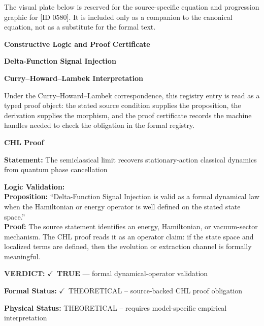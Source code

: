 \begingroup\footnotesize\sloppy
The visual plate below is reserved for the source-specific equation and progression graphic for [ID 0580]. It is included only as a companion to the canonical equation, not as a substitute for the formal text.
\par\endgroup
\ifTZPDarkEdition
{}
\fi

\clearpage
\begingroup\tzpsupportsetup
\noindent\textbf{\fontsize{10.8pt}{12.8pt}\selectfont [ID 0580] Constructive Logic and Proof Certificate}\par
\noindent\textbf{\fontsize{10pt}{12pt}\selectfont Delta-Function Signal Injection}\par
\vspace{0.45em}
\begingroup
\footnotesize
\setlength{\parskip}{0.22em}
\setlength{\parindent}{0pt}
\noindent\textbf{Curry--Howard--Lambek Interpretation}\par
Under the Curry--Howard--Lambek correspondence, this registry entry is read as a typed proof
object: the stated source condition supplies the proposition, the derivation supplies the
morphism, and the proof certificate records the machine handles needed to check the obligation
in the formal registry.

\vspace{0.45em}
\noindent\textbf{CHL Proof}\par
\textbf{Statement:} The semiclassical limit recovers stationary-action classical dynamics from quantum phase
cancellation

\textbf{Logic Validation:}\\
\textbf{Proposition:} ``Delta-Function Signal Injection is valid as a formal dynamical law when the Hamiltonian
or energy operator is well defined on the stated state space.''\\
\textbf{Proof:} The source statement identifies an energy, Hamiltonian, or vacuum-sector mechanism. The
CHL proof reads it as an operator claim: if the state space and localized terms are
defined, then the evolution or extraction channel is formally meaningful.

\textbf{VERDICT:} \ensuremath{\checkmark}\ \textbf{TRUE} --- formal dynamical-operator validation

\textbf{Formal Status:} \ensuremath{\checkmark}\ THEORETICAL -- source-backed CHL proof obligation

\textbf{Physical Status:} THEORETICAL -- requires model-specific empirical interpretation
\par\vspace{0.45em}
\par
\ifTZPDarkEdition
{}
\fi
\endgroup
\endgroup

